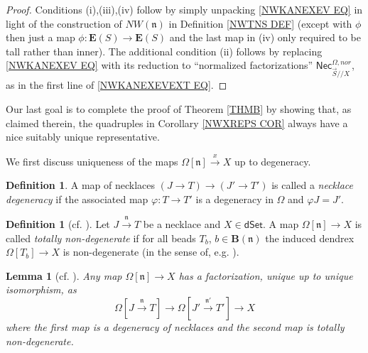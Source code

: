 \documentclass[a4paper,10pt
,draft
]{article}%
\numberwithin{equation}{section}
\numberwithin{figure}{section}
\newtheorem{lemma}[equation]{Lemma}%
\theoremstyle{definition} %
\newtheorem{definition}[equation]{Definition}%
\newcommand{\1}{\ensuremath{\mathbbm 1}}%
\begin{document}
\begin{proof}
	Conditions (i),(iii),(iv) follow by simply unpacking \eqref{NWKANEXEV EQ} in light of the construction of 
	$NW(\mathfrak{n})$ in Definition \ref{NWTNS DEF}
	(except with $\phi$ then just a map
	$\phi\colon \boldsymbol{E}(S) \to \boldsymbol{E}(S)$
	and the last map in (iv) only required to be tall rather than inner).
	The additional condition (ii) follows by replacing 
	\eqref{NWKANEXEV EQ} with its reduction to 
	``normalized
	factorizations''
	$\mathsf{Nec}_{\vec{S}//X}^{\Omega,nor}$,
	as in the first line of \eqref{NWKANEXEVEXT EQ}.
\end{proof}



Our last goal is to complete the proof of Theorem \ref{THMB}
by showing that, as claimed therein, 
the quadruples in Corollary \ref{NWXREPS COR}
always have a nice suitably unique representative.


We first discuss uniqueness of the maps
$\Omega[\mathfrak{n}] \xrightarrow{x} X$ up to degeneracy.

\begin{definition}\label{NECKDEG DEF}
	A map of necklaces 
	$(J\to T) \to (J' \to T')$
	is called a \emph{necklace degeneracy}
	if the associated map
	$\varphi \colon T \to T'$
	is a degeneracy in $\Omega$
	and $\varphi J = J'$.
\end{definition}



\begin{definition}[{cf. \cite[\S 4]{DS11}}]
        \label{TOTNONDEG_DEF}
	Let $J \xrightarrow{\mathfrak{n}} T$ be a necklace and 
	$X \in \mathsf{dSet}$.
	A map $\Omega[\mathfrak{n}] \to X$
	is called \emph{totally non-degenerate}
	if for all beads $T_b$, 
	$b \in \boldsymbol{B}(\mathfrak{n})$
	the induced dendrex
	$\Omega[T_b] \to X$
	is non-degenerate (in the sense of, 
	e.g. \cite[Prop. 5.62]{Per18}).
\end{definition}



\begin{lemma}[{cf. \cite[Prop. 4.7]{DS11}}]
	\label{DEGNECK LEM}
	Any map 
	$\Omega[\mathfrak{n}] \to X$
	has a factorization, unique up to unique isomorphism, as
\[
	\Omega[J \xrightarrow{\mathfrak{n}} T] \to 
	\Omega[J' \xrightarrow{\mathfrak{n'}} T'] \to X
\]
	where the first map is a degeneracy of necklaces
	and the second map is totally non-degenerate.
\end{lemma}
\end{document}
